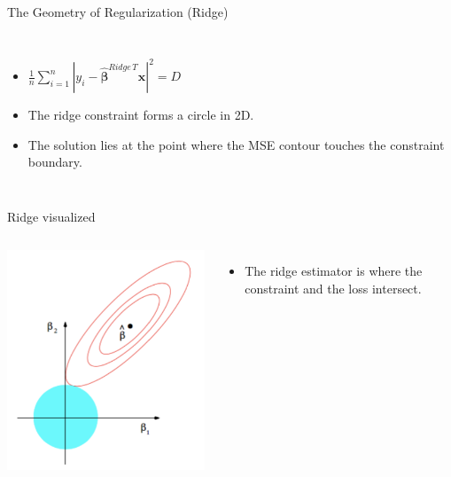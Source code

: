 \begin{frame}{The Geometry of Regularization (Ridge)}
\begin{columns}
    \begin{itemize}
        \item $\frac{1}{n} \sum_{i=1}^n \left| y_i - \hat{\boldsymbol{\beta}}^{Ridge\, T} \boldsymbol{x} \right|^2 = D$
        \item The ridge constraint forms a circle in 2D.
        \item The solution lies at the point where the MSE contour touches the constraint boundary.
    \end{itemize}

\end{columns}

\end{frame}


\begin{frame}{Ridge visualized}

\begin{columns}
    \includegraphics[width=\linewidth]{images/linear-regression/linear-regression-30.png}
    \begin{itemize}
        \item The ridge estimator is where the constraint and the loss intersect.
    \end{itemize}


\end{columns}
\end{frame}
